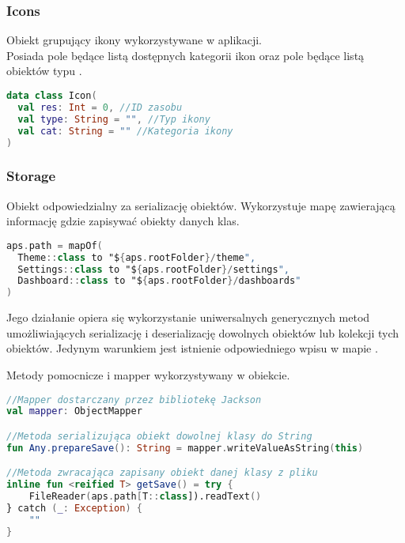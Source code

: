 \subsubsection{Icons}
Obiekt grupujący ikony wykorzystywane w aplikacji.\\
Posiada pole  będące listą dostępnych kategorii ikon oraz pole  będące listą obiektów typu .

\begin{lstlisting}[language=Kotlin]
data class Icon(
  val res: Int = 0, //ID zasobu
  val type: String = "", //Typ ikony
  val cat: String = "" //Kategoria ikony
)
\end{lstlisting}

\newpage

\subsubsection{Storage}
Obiekt odpowiedzialny za serializację obiektów. Wykorzystuje mapę  zawierającą informację gdzie zapisywać obiekty danych klas.

\begin{lstlisting}[language=Kotlin]
aps.path = mapOf(
  Theme::class to "${aps.rootFolder}/theme",
  Settings::class to "${aps.rootFolder}/settings",
  Dashboard::class to "${aps.rootFolder}/dashboards"
)
\end{lstlisting}

\vspace{1em}

Jego działanie opiera się wykorzystanie uniwersalnych generycznych metod umożliwiających serializację i deserializację dowolnych obiektów lub kolekcji tych obiektów. Jedynym warunkiem jest istnienie odpowiedniego wpisu w mapie .\\

\vspace{1em}

Metody pomocnicze i mapper wykorzystywany w obiekcie.

\begin{lstlisting}[language=Kotlin]
//Mapper dostarczany przez bibliotekę Jackson
val mapper: ObjectMapper

//Metoda serializująca obiekt dowolnej klasy do String
fun Any.prepareSave(): String = mapper.writeValueAsString(this)

//Metoda zwracająca zapisany obiekt danej klasy z pliku
inline fun <reified T> getSave() = try {
    FileReader(aps.path[T::class]).readText()
} catch (_: Exception) {
    ""
}
\end{lstlisting}

